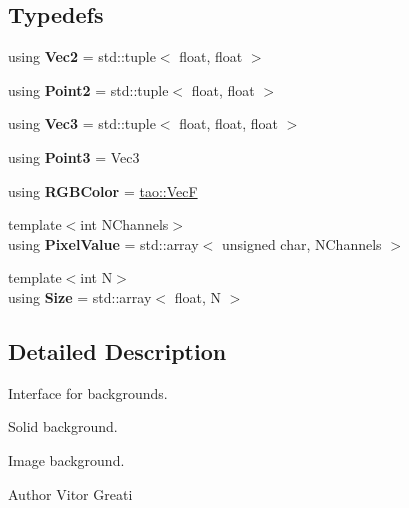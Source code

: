 \subsection*{Typedefs}
\begin{DoxyCompactItemize}
\item 
\mbox{\label{namespacerayt_a3a5e1628e85e38c81b38506c119f30aa}} 
using {\bfseries Vec2} = std\+::tuple$<$ float, float $>$
\item 
\mbox{\label{namespacerayt_a9544d78fd57b38b80c71fafb5e097d5f}} 
using {\bfseries Point2} = std\+::tuple$<$ float, float $>$
\item 
\mbox{\label{namespacerayt_a30e5d54dd5092618c5035ccf243b817d}} 
using {\bfseries Vec3} = std\+::tuple$<$ float, float, float $>$
\item 
\mbox{\label{namespacerayt_a6ab48c41b6e7e5f296c571a9ee315fd6}} 
using {\bfseries Point3} = Vec3
\item 
\mbox{\label{namespacerayt_a3a8cba490cb2c3d842882bf900ae25dd}} 
using {\bfseries R\+G\+B\+Color} = \mbox{\hyperlink{namespacetao_acdec2e843192294a6f3d4ab911c6cbae}{tao\+::\+VecF}}
\item 
\mbox{\label{namespacerayt_a3e68e13facd362d016b5336e1ed10056}} 
{\footnotesize template$<$int N\+Channels$>$ }\\using {\bfseries Pixel\+Value} = std\+::array$<$ unsigned char, N\+Channels $>$
\item 
\mbox{\label{namespacerayt_afd460c6085b0cd5ccd92c4f10c6c4b62}} 
{\footnotesize template$<$int N$>$ }\\using {\bfseries Size} = std\+::array$<$ float, N $>$
\end{DoxyCompactItemize}


\subsection{Detailed Description}
Interface for backgrounds. 

Solid background.

Image background.

\begin{DoxyAuthor}{Author}
Vitor Greati 
\end{DoxyAuthor}
